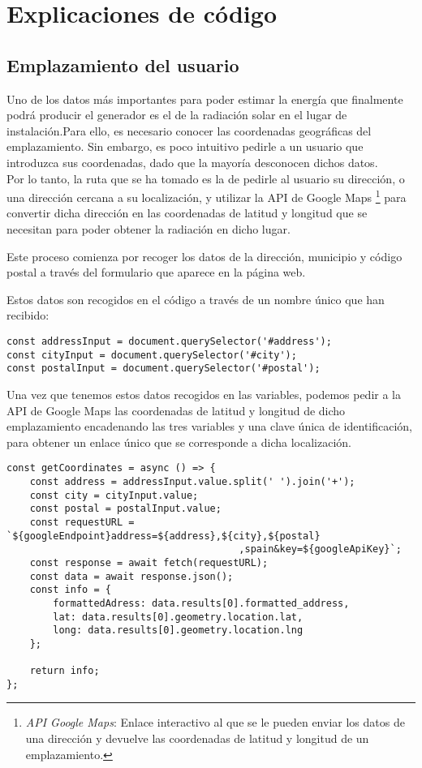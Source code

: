 \section{Explicaciones de código}

\subsection{Emplazamiento del usuario}
Uno de los datos más importantes para poder estimar la energía que finalmente podrá producir el generador es el de la radiación solar en el lugar de instalación.Para ello, es necesario conocer las coordenadas geográficas del emplazamiento. Sin embargo, es poco intuitivo pedirle a un usuario que introduzca sus coordenadas, dado que la mayoría desconocen dichos datos.\\
Por lo tanto, la ruta que se ha tomado es la de pedirle al usuario su dirección, o una dirección cercana a su localización, y utilizar la API de Google Maps \footnote{\textit{API Google Maps}: Enlace interactivo al que se le pueden enviar los datos de una dirección y devuelve las coordenadas de latitud y longitud de un emplazamiento.  } para convertir dicha dirección en las coordenadas de latitud y longitud que se necesitan para poder obtener la radiación en dicho lugar.

Este proceso comienza por recoger los datos de la dirección, municipio y código postal a través del formulario que aparece en la página web.

Estos datos son recogidos en el código a través de un nombre único que han recibido:\\
\begin{lstlisting}[style=ES6, caption={Variables correspondientes a los tres campos}]
const addressInput = document.querySelector('#address');
const cityInput = document.querySelector('#city');
const postalInput = document.querySelector('#postal');
\end{lstlisting}

Una vez que tenemos estos datos recogidos en las variables, podemos pedir a la API de Google Maps las coordenadas de latitud y longitud de dicho emplazamiento encadenando las tres variables y una clave única de identificación,  para obtener un enlace único que se corresponde a dicha localización.
\begin{lstlisting}[style=ES6, label={lst:getCoordinates}, caption={Función encargada de solicitar los datos a la API}]
const getCoordinates = async () => {
	const address = addressInput.value.split(' ').join('+');
	const city = cityInput.value;
	const postal = postalInput.value;
	const requestURL = `${googleEndpoint}address=${address},${city},${postal}
										,spain&key=${googleApiKey}`;
	const response = await fetch(requestURL);
	const data = await response.json();
	const info = {
		formattedAdress: data.results[0].formatted_address,
		lat: data.results[0].geometry.location.lat,
		long: data.results[0].geometry.location.lng
	};

	return info;
};
\end{lstlisting}

